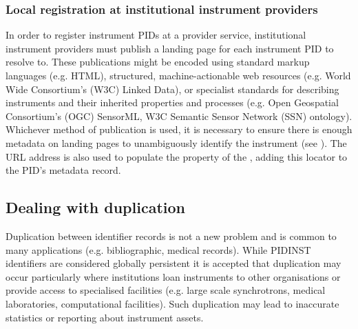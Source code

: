 \documentclass[a4paper,10pt,english]{sphinxmanual}
\begin{document}
\subsubsection{Local registration at institutional instrument providers}
\label{\detokenize{white-paper/registration:local-registration-at-institutional-instrument-providers}}
In order to register instrument PIDs at a provider service,
institutional instrument providers must publish a landing page for each
instrument PID to resolve to. These publications might be encoded using
standard markup languages (e.g. HTML), structured, machine-actionable
web resources (e.g. World Wide Consortium’s (W3C) Linked Data), or
specialist standards for describing instruments and their inherited
properties and processes (e.g. Open Geospatial Consortium’s (OGC)
SensorML, W3C Semantic Sensor Network (SSN) ontology). Whichever method
of publication is used, it is necessary to ensure there is enough
metadata on landing pages to unambiguously identify the instrument (see
{\hyperref[\detokenize{white-paper/landing-page-content:landing-page-content}]{}}). The URL address is also used to populate
the  property of the , adding this
locator to the PID’s metadata record.


\subsection{Dealing with duplication}
\label{\detokenize{white-paper/duplication:dealing-with-duplication}}\label{\detokenize{white-paper/duplication::doc}}
Duplication between identifier records is not a new problem and is
common to many applications (e.g. bibliographic, medical records). While
PIDINST identifiers are considered globally persistent it is accepted
that duplication may occur particularly where institutions loan
instruments to other organisations or provide access to specialised
facilities (e.g. large scale synchrotrons, medical laboratories,
computational facilities). Such duplication may lead to inaccurate
statistics or reporting about instrument assets.
\end{document}
